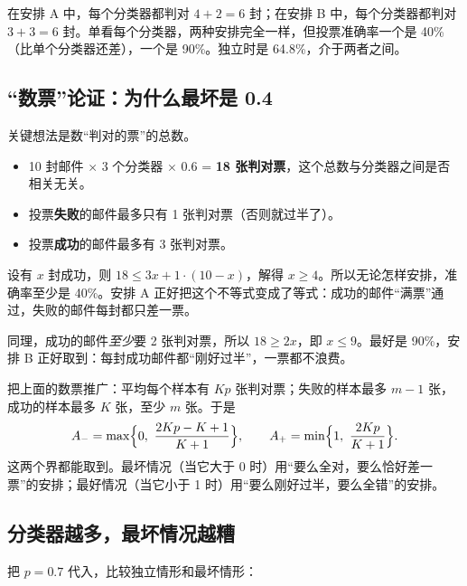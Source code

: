 \documentclass[11pt]{article}
\begin{document}
在安排 A 中，每个分类器都判对 $4+2=6$ 封；在安排 B 中，每个分类器都判对 $3+3=6$ 封。单看每个分类器，两种安排完全一样，但投票准确率一个是 40\%（比单个分类器还差），一个是 90\%。独立时是 64.8\%，介于两者之间。

\subsection{“数票”论证：为什么最坏是 0.4}
关键想法是数“判对的票”的总数。

\begin{itemize}
\item 10 封邮件 $\times$ 3 个分类器 $\times$ 0.6 = \textbf{18 张判对票}，这个总数与分类器之间是否相关无关。
\item 投票\textbf{失败}的邮件最多只有 1 张判对票（否则就过半了）。
\item 投票\textbf{成功}的邮件最多有 3 张判对票。
\end{itemize}
设有 $x$ 封成功，则 $18\le 3x+1\cdot(10-x)$，解得 $x\ge4$。所以无论怎样安排，准确率至少是 40\%。安排 A 正好把这个不等式变成了等式：成功的邮件“满票”通过，失败的邮件每封都只差一票。

同理，成功的邮件\emph{至少}要 2 张判对票，所以 $18\ge2x$，即 $x\le9$。最好是 90\%，安排 B 正好取到：每封成功邮件都“刚好过半”，一票都不浪费。

\begin{goodbox}[title=一般公式（$K$ 个分类器，准确率都是 $p$）]
把上面的数票推广：平均每个样本有 $Kp$ 张判对票；失败的样本最多 $m-1$ 张，成功的样本最多 $K$ 张，至少 $m$ 张。于是
\[
\Amin=\max\Bigl\{0,\ \frac{2Kp-K+1}{K+1}\Bigr\},\qquad \Aplus=\min\Bigl\{1,\ \frac{2Kp}{K+1}\Bigr\}.
\]
这两个界都能取到。最坏情况（当它大于 0 时）用“要么全对，要么恰好差一票”的安排；最好情况（当它小于 1 时）用“要么刚好过半，要么全错”的安排。
\end{goodbox}

\subsection{分类器越多，最坏情况越糟}
把 $p=0.7$ 代入，比较独立情形和最坏情形：
\end{document}
